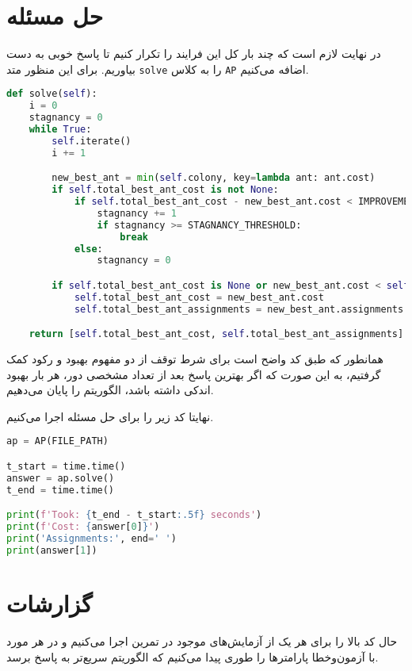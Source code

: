 \documentclass[a4paper, 12pt]{article}
\theoremstyle{definition}
\begin{document}
\section{حل مسئله}

در نهایت لازم است که چند بار کل این فرایند را تکرار کنیم تا پاسخ خوبی به دست بیاوریم. برای این منظور متد
\texttt{solve}
را به کلاس
\texttt{AP}
اضافه می‌کنیم.

\LTR
\begin{lstlisting}[language=Python]
def solve(self):
    i = 0
    stagnancy = 0
    while True:
        self.iterate()
        i += 1

        new_best_ant = min(self.colony, key=lambda ant: ant.cost)
        if self.total_best_ant_cost is not None:
            if self.total_best_ant_cost - new_best_ant.cost < IMPROVEMENT_THRESHOLD:
                stagnancy += 1
                if stagnancy >= STAGNANCY_THRESHOLD:
                    break
            else:
                stagnancy = 0

        if self.total_best_ant_cost is None or new_best_ant.cost < self.total_best_ant_cost:
            self.total_best_ant_cost = new_best_ant.cost
            self.total_best_ant_assignments = new_best_ant.assignments.copy()

    return [self.total_best_ant_cost, self.total_best_ant_assignments]
\end{lstlisting}
\RTL

همانطور که طبق کد واضح است برای شرط توقف از دو مفهوم بهبود و رکود کمک گرفتیم، به این صورت که اگر بهترین پاسخ بعد از تعداد مشخصی دور، هر بار بهبود اندکی داشته باشد، الگوریتم را پایان می‌دهیم.

نهایتا کد زیر را برای حل مسئله اجرا می‌کنیم.

\LTR
\begin{lstlisting}[language=Python]
ap = AP(FILE_PATH)

t_start = time.time()
answer = ap.solve()
t_end = time.time()

print(f'Took: {t_end - t_start:.5f} seconds')
print(f'Cost: {answer[0]}')
print('Assignments:', end=' ')
print(answer[1])
\end{lstlisting}
\RTL

\section{گزارشات}
حال کد بالا را برای هر یک از آزمایش‌های موجود در تمرین اجرا می‌کنیم و در هر مورد با آزمون‌وخطا پارامترها را طوری پیدا می‌کنیم که الگوریتم سریع‌تر به پاسخ برسد.
\end{document}
